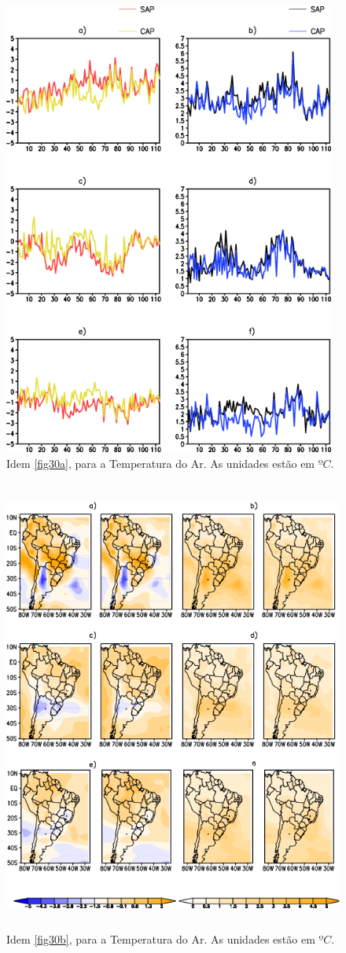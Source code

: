 \begin{figure}[!hbp]
\centering
\includegraphics[height=15cm]{./figs/vies_eqm-temp.png}
\caption{Idem \autoref{fig30a}, para a Temperatura do Ar. As unidades estão em $ºC$.}
\label{fig31a}
\end{figure}

\begin{figure}[!hbp]
\centering
\includegraphics[height=15cm]{./figs/campo_vies_eqm-temp.png}
\caption{Idem \autoref{fig30b}, para a Temperatura do Ar. As unidades estão em $ºC$.}
\label{fig31b}
\end{figure}

